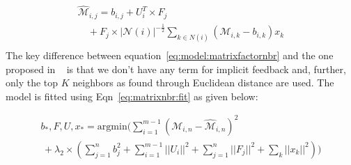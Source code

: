 \vspace{-1em}
\begin{equation}
  \label{eq:model:matrixfactornbr}
  \begin{array}{l}
    \widehat{\mathcal{M}}_{i,j}  =   b_{i,j} + U_i^T\times F_j \\
                  \quad             + F_j \times |\mathcal{N}(i)|^{-\frac{1}{2}}\sum_{k \in N(i)} (\mathcal{M}_{i,k} - b_{i,k}) x_k \\
  \end{array}
\end{equation}
\noindent
The key difference between equation~\ref{eq:model:matrixfactornbr} and the one proposed in 
~\cite{koren2008factor} is that we don't have any term for implicit feedback and, further,
only the top $K$ neighbors as found through Euclidean distance are used. 
The model is fitted using Eqn~\ref{eq:matrixnbr:fit} as given below:

\vspace{-1em}
\begin{equation}
  \label{eq:matrixnbr:fit}
  \begin{array}{l}
    b_*, F, U, x_*  = \textrm{argmin} (\sum \limits_{i=1}^{m-1} \left(\mathcal{M}_{i,n} - \widehat{\mathcal{M}}_{i,n}   \right)^2 \\
                \,   + \lambda_2\times(\sum \limits_{j=1}^{n}b_j^2 +
                \sum \limits_{i=1}^{m-1} || U_i||^2 + \sum
                \limits_{j=1}^{n} || F_j||^2 + \sum \limits_k ||x_k||^2))
  \end{array}
  \end{equation}


